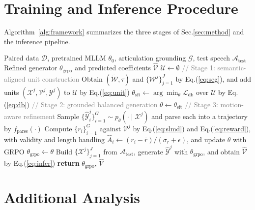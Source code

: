 \section{Training and Inference Procedure}
\label{app:algorithm}

Algorithm~\ref{alg:framework} summarizes the three stages of Sec.\ref{sec:method} and the inference pipeline.

\begin{algorithm}[h]
\caption{Training and Inference of AudioMouth}
\label{alg:framework}
\small
\begin{algorithmic}[1]
\REQUIRE Paired data $\mathcal{D}$, pretrained MLLM $\theta_{0}$, articulation grounding $\mathcal{G}$, test speech $\mathcal{A}_{\mathrm{test}}$
\ENSURE Refined generator $\theta_{\mathrm{grpo}}$ and predicted coefficients $\hat{\mathcal{V}}$
\STATE $\mathcal{U}\leftarrow\emptyset$ \hfill \textcolor{gray}{// Stage 1: semantic-aligned unit construction}
    \STATE Obtain $\left(\tilde{\mathcal{W}},\tau\right)$ and $\{\mathcal{W}^{j}\}_{j=1}^{J}$ by Eq.(\ref{eq:seg}), and add units $(\mathcal{X}^{j},\mathcal{V}^{j},\mathcal{Y}^{j})$ to $\mathcal{U}$ by Eq.(\ref{eq:unit})
\ENDFOR
\STATE $\theta_{\mathrm{sft}}\leftarrow\arg\min_{\theta}\mathcal{L}_{\mathrm{db}}$ over $\mathcal{U}$ by Eq.(\ref{eq:db}) \hfill \textcolor{gray}{// Stage 2: grounded balanced generation}
\STATE $\theta\leftarrow\theta_{\mathrm{sft}}$ \hfill \textcolor{gray}{// Stage 3: motion-aware refinement}
    \STATE Sample $\{\hat{\mathcal{Y}}^{j}_{i}\}_{i=1}^{G}\sim p_{\theta}\!\left(\cdot\mid\mathcal{X}^{j}\right)$ and parse each into a trajectory by $f_{\mathrm{parse}}(\cdot)$
    \STATE Compute $\{r_{i}\}_{i=1}^{G}$ against $\mathcal{V}^{j}$ by Eq.(\ref{eq:slmd}) and Eq.(\ref{eq:reward}), with validity and length handling
    \STATE $\hat{A}_{i}\leftarrow\left(r_{i}-\bar{r}\right)/\left(\sigma_{r}+\epsilon\right)$, and update $\theta$ with GRPO
\ENDFOR
\STATE $\theta_{\mathrm{grpo}}\leftarrow\theta$
\STATE Build $\{\mathcal{X}^{j}\}_{j=1}^{J}$ from $\mathcal{A}_{\mathrm{test}}$, generate $\hat{\mathcal{Y}}^{j}$ with $\theta_{\mathrm{grpo}}$, and obtain $\hat{\mathcal{V}}$ by Eq.(\ref{eq:infer})
\STATE \textbf{return} $\theta_{\mathrm{grpo}}$, $\hat{\mathcal{V}}$
\end{algorithmic}
\end{algorithm}

\section{Additional Analysis}
\label{app:additional}

